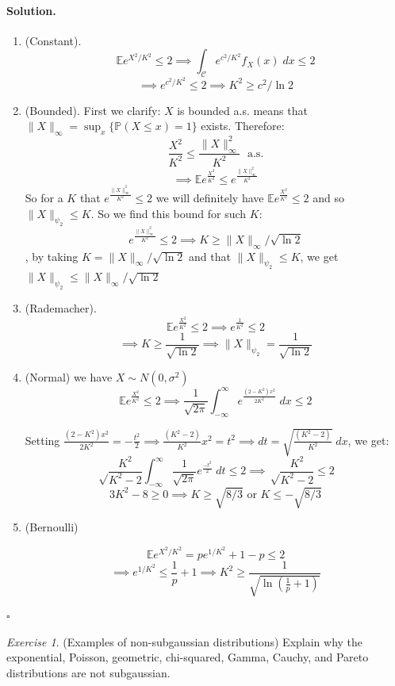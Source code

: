 \documentclass[11pt]{article}
\theoremstyle{definition}
\theoremstyle{remark}
\newtheorem{exercise}{Exercise}[section]
\newenvironment{solution}{\paragraph{Solution.}}{\hfill$\square$\medskip}
\newcommand{\E}{\mathbb{E}}
\newcommand{\Prob}{\mathbb{P}}
\newcommand{\1}{\mathbf{1}}
\newcommand{\subg}{{\psi_2}}
\begin{document}
\begin{solution}
	\begin{enumerate}
		\item (Constant).
		\[
		\E e^{X^2/K^2} \leq 2 \implies \int_\mathcal{C} e^{c^2/K^2} f_X(x) \; dx \leq 2
		\]
		\[
		\implies  e^{c^2/K^2} \leq 2 \implies K^2 \geq c^2 / \ln2
		\]
		
		\item (Bounded). First we clarify: \(X\) is bounded a.s. means that \(\|X\|_\infty = \sup_x \{\Prob(X \leq x) = 1\} \) exists. Therefore:
		\[
		 \frac{X^2}{K^2} \leq  \frac{\|X\|_\infty^2}{K^2} \;\text{ a.s.}
		\]
		\[
		\implies \E e^\frac{X^2}{K^2} \leq  e^\frac{\|X\|_\infty^2}{K^2}
		\]
		So for a \(K\) that \(e^\frac{\|X\|_\infty^2}{K^2} \leq 2\) we will definitely have \(\E e^\frac{X^2}{K^2} \leq 2\) and so \(\|X\|_{\subg} \leq K\). So we find this bound for such \(K\):
		\[
		e^\frac{\|X\|_\infty^2}{K^2} \leq 2 \implies K \geq \|X\|_\infty/\sqrt{\ln2}
		\],
		by taking \(K = \|X\|_\infty/\sqrt{\ln2}\) and that \(\|X\|_{\subg} \leq K\), we get \( \|X\|_{\subg} \leq \|X\|_\infty/\sqrt{\ln2} \)
		
		\item (Rademacher).
		\[
		\E e^{\frac{X^2}{K^2}} \leq 2 \implies e^{\frac{1}{K^2}} \leq 2
		\]
		\[
		\implies K \geq \frac{1}{\sqrt{\ln 2}} \implies \|X\|_\subg = \frac{1}{\sqrt{\ln 2}}
		\]
		\item  (Normal) we have \(X \sim N(0, \sigma^2)\)
		\[
		\E e^{\frac{X^2}{K^2}} \leq 2 \implies \frac{1}{\sqrt{2\pi}} \int_{-\infty}^\infty e^{ \frac{(2 - K^2)x^2}{2K^2} } \; dx \leq 2
		\]
		
		Setting \( \frac{(2 - K^2)x^2}{2K^2} = -\frac{t^2}{2} \implies \frac{(K^2-2)}{K^2} x^2 = t^2 \implies dt = \sqrt{\frac{(K^2-2)}{K^2}} \; dx\), we get:
		\[
		  \sqrt\frac{K^2}{K^2-2} \int_{-\infty}^\infty \frac{1}{\sqrt{2\pi}} e^{ \frac{-t^2}{2} } \; dt \leq 2 \implies  \sqrt\frac{K^2}{K^2-2} \leq 2
		\]
		\[
		3K^2-8 \geq 0 \implies K \geq \sqrt{8/3} \text{ or } K \leq -\sqrt{8/3}
		\]
		\item (Bernoulli) 
		
		\[
		\E e^{X^2/K^2} = pe^{1/K^2} + 1-p \leq 2
		\]
		\[
		\implies e^{1/K^2} \leq \frac{1}{p} + 1 \implies K^2 \geq \frac{1}{\sqrt{\ln( \frac{1}{p} + 1 )}}
		\]
		
	\end{enumerate}
\end{solution}

\begin{exercise}
	(Examples of non-subgaussian distributions) Explain why the exponential, Poisson,
	geometric, chi-squared, Gamma, Cauchy, and Pareto distributions are not subgaussian.
\end{exercise}
\end{document}
